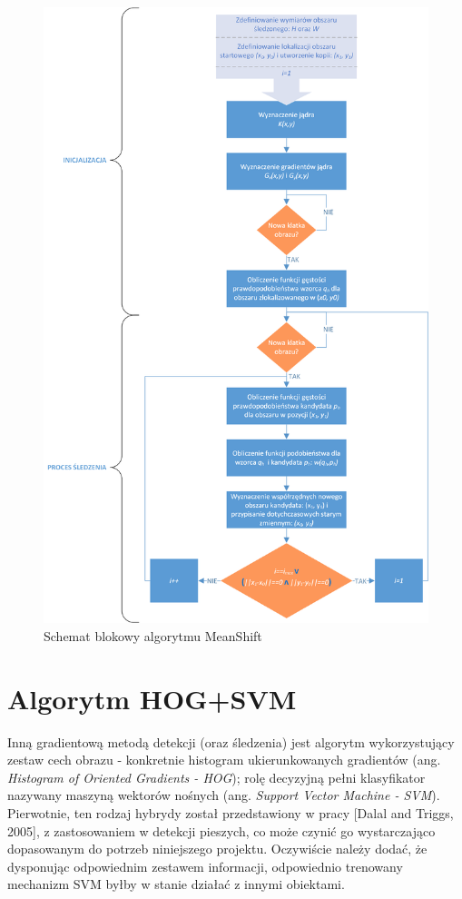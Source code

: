 \begin{figure}
	\centering
	\hspace*{-3cm}
	\includegraphics[width=14.5cm]{2_MS_visio.png}
	\caption{Schemat blokowy algorytmu MeanShift}
	\label{fig:MS_diagram}
\end{figure}

\section{Algorytm HOG+SVM}
\label{sec:HOG&SVM}
Inną gradientową metodą detekcji (oraz śledzenia) jest algorytm wykorzystujący zestaw cech obrazu - konkretnie histogram ukierunkowanych gradientów (ang. \textit{Histogram of Oriented Gradients - HOG}); rolę decyzyjną pełni klasyfikator nazywany maszyną wektorów nośnych (ang. \textit{Support Vector Machine - SVM}). Pierwotnie, ten rodzaj hybrydy został przedstawiony w pracy [Dalal and Triggs, 2005], z zastosowaniem w detekcji pieszych, co może czynić go wystarczająco dopasowanym do potrzeb niniejszego projektu. Oczywiście należy dodać, że dysponując odpowiednim zestawem informacji, odpowiednio trenowany mechanizm SVM byłby w stanie działać z innymi obiektami.

